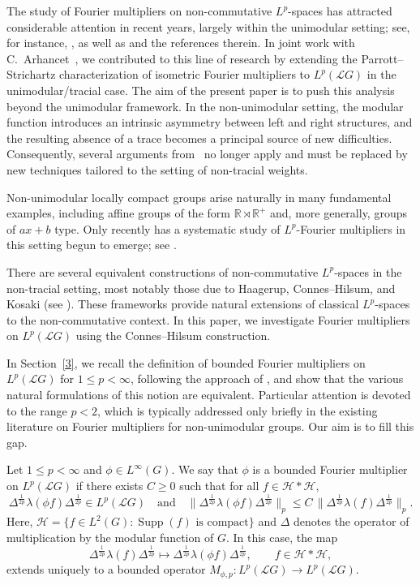 \documentclass[12pt]{amsart}
\theoremstyle{remark}
\theoremstyle{definition}
\numberwithin{equation}{section}
\begin{document}
The study of Fourier multipliers on non-commutative $L^p$-spaces has attracted considerable attention in recent years, largely within the unimodular setting; see, for instance, \cite{CDLS, GJP, PRD}, as well as \cite{P} and the references therein. In joint work with C.~Arhancet~\cite{AKLZ}, we contributed to this line of research by extending the Parrott--Strichartz characterization of isometric Fourier multipliers to $L^p(\mathcal L G)$ in the unimodular/tracial case. The aim of the present paper is to push this analysis beyond the unimodular framework. In the non-unimodular setting, the modular function introduces an intrinsic asymmetry between left and right structures, and the resulting absence of a trace becomes a principal source of new difficulties. Consequently, several arguments from~\cite{AKLZ} no longer apply and must be replaced by new techniques tailored to the setting of non-tracial weights.

Non-unimodular locally compact groups arise naturally in many fundamental examples, including affine groups of the form $\mathbb{R} \rtimes \mathbb{R}^+$ and, more generally, groups of $ax+b$ type. Only recently has a systematic study of $L^p$-Fourier multipliers in this setting begun to emerge; see \cite{Cas, CPPR, CDLS, DL, PDT, Terp2, VosPaper, Vos}.

There are several equivalent constructions of non-commutative $L^p$-spaces in the non-tracial setting, most notably those due to Haagerup, Connes--Hilsum, and Kosaki (see \cite{H, Hil, Hiai, Ko, Terp0, Terp1}). These frameworks provide natural extensions of classical $L^p$-spaces to the non-commutative context. In this paper, we investigate Fourier multipliers on $L^p(\mathcal L G)$ using the Connes--Hilsum construction.

In Section~\ref{3}, we recall the definition of bounded Fourier multipliers on $L^p(\mathcal L G)$ for $1 \le p < \infty$, following the approach of \cite{Vos}, and show that the various natural formulations of this notion are equivalent. Particular attention is devoted to the range $p < 2$, which is typically addressed only briefly in the existing literature on Fourier multipliers for non-unimodular groups. Our aim is to fill this gap.

Let $1\le p<\infty$ and $\phi\in L^\infty(G)$. We say that $\phi$ is a bounded Fourier multiplier on $L^p(\mathcal L G)$ if there exists $C\ge0$ such that for all $f\in\mathcal H\ast\mathcal H$,
\[
\Delta^{\frac1{2p}}\lambda(\phi f)\Delta^{\frac1{2p}}\in L^p(\mathcal L G)
\quad\text{and}\quad
\bigl\|\Delta^{\frac1{2p}}\lambda(\phi f)\Delta^{\frac1{2p}}\bigr\|_p
\le
C\,\bigl\|\Delta^{\frac1{2p}}\lambda(f)\Delta^{\frac1{2p}}\bigr\|_p.
\]
Here, $\mathcal H=\{f\in L^2(G):\operatorname{Supp}(f)\text{ is compact}\}$ and $\Delta$ denotes the operator of multiplication by the modular function of $G$. In this case, the map
\[
\Delta^{\frac1{2p}}\lambda(f)\Delta^{\frac1{2p}}
\longmapsto
\Delta^{\frac1{2p}}\lambda(\phi f)\Delta^{\frac1{2p}},\qquad f\in\mathcal H\ast\mathcal H,
\]
extends uniquely to a bounded operator \(M_{\phi,p}\colon L^p(\mathcal L G)\to L^p(\mathcal L G)\).
\end{document}
